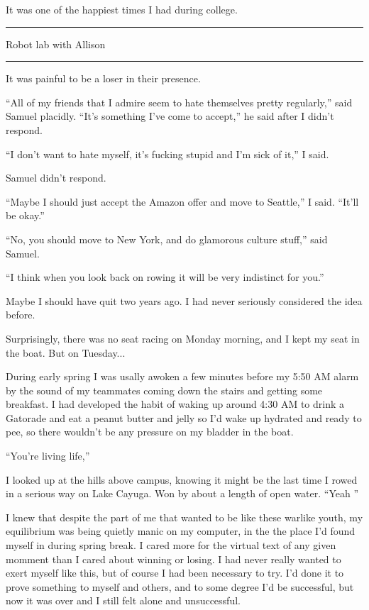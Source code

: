 It was one of the happiest times I had during college.

\plainfancybreak{12pt}{2}{* * *}

Robot lab with Allison

\plainfancybreak{12pt}{2}{* * *}

It was painful to be a loser in their presence.  

``All of my friends that I admire seem to hate themselves pretty regularly,''
said Samuel placidly.  ``It's something I've come to accept,'' he said after I
didn't respond.

``I don't want to hate myself, it's fucking stupid and I'm sick of it,'' I said.  

Samuel didn't respond.

``Maybe I should just accept the Amazon offer and move to Seattle,'' I said.
``It'll be okay.''

``No, you should move to New York, and do glamorous culture stuff,'' said
Samuel.

``I think when you look back on rowing it will be very indistinct for you.'' 

Maybe I should have quit two years ago.  I had never seriously considered the
idea before.

Surprisingly, there was no seat racing on Monday morning, and I kept my seat in
the boat.  But on Tuesday...

During early spring I was usally awoken a few minutes before my 5:50 AM alarm by
the sound of my teammates coming down the stairs and getting some breakfast.  I
had developed the habit of waking up around 4:30 AM to drink a Gatorade and eat
a peanut butter and jelly so I'd wake up hydrated and ready to pee, so there
wouldn't be any pressure on my bladder in the boat. 

``You're living life,''

I looked up at the hills above campus, knowing it might be the last time I rowed
in a serious way on Lake Cayuga.  Won by about a length of open water.  ``Yeah
'' 

I knew that despite the part of me that wanted to be like these warlike youth,
my equilibrium was being quietly manic on my computer, in the the place I'd
found myself in during spring break.  I cared more for the virtual text of any
given momment than I cared about winning or losing.  I had never really wanted
to exert myself like this, but of course I had been necessary to try.  I'd done
it to prove something to myself and others, and to some degree I'd be
successful, but now it was over and I still felt alone and unsuccessful.

